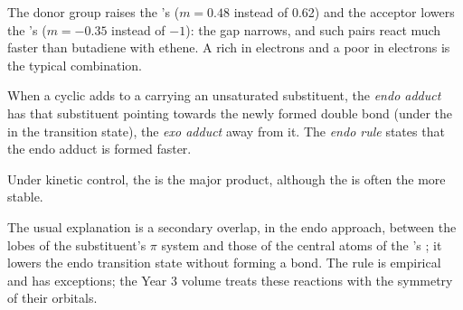 The donor group raises the 's  ($m = 0.48$ instead of 0.62) and the acceptor
lowers the 's  ($m = -0.35$ instead of $-1$): the gap narrows, and such
pairs react much faster than butadiene with ethene. A  rich in electrons and a
 poor in electrons is the typical combination.

\begin{definition}\label{def:b2:frontier-orbitals:endo}
When a cyclic  adds to a  carrying an unsaturated substituent, the
\emph{endo adduct} has that substituent pointing towards the newly
formed double bond (under the  in the transition state), the \emph{exo
adduct} away from it. The \emph{endo rule} states
that the endo adduct is formed faster.
\end{definition}

\begin{proposition}\label{prop:b2:frontier-orbitals:endo}
Under kinetic control, the  is the major product, although the 
is often the more stable.
\end{proposition}

\admitted

The usual explanation is a secondary overlap, in the endo approach, between the
lobes of the substituent's $\pi$ system and those of the central atoms of the 's
; it lowers the endo transition state without forming a bond. The rule is
empirical and has exceptions; the Year 3 volume treats these reactions with the
symmetry of their orbitals.


